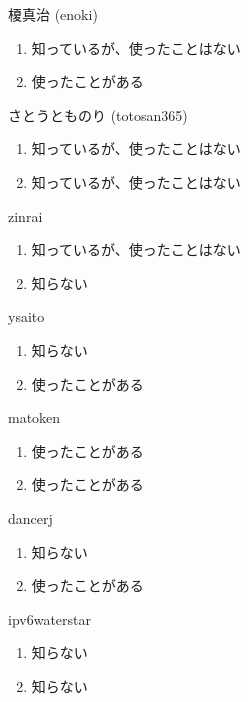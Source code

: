 \begin{prework}{ 榎真治 (enoki) }
  \begin{enumerate}
  \item 知っているが、使ったことはない
  \item 使ったことがある
  \end{enumerate}
\end{prework}

\begin{prework}{ さとうとものり (totosan365) }
  \begin{enumerate}
  \item 知っているが、使ったことはない
  \item 知っているが、使ったことはない
  \end{enumerate}
\end{prework}

\begin{prework}{ zinrai }
  \begin{enumerate}
  \item 知っているが、使ったことはない
  \item 知らない
  \end{enumerate}
\end{prework}

\begin{prework}{ ysaito }
  \begin{enumerate}
  \item 知らない
  \item 使ったことがある
  \end{enumerate}
\end{prework}

\begin{prework}{ matoken }
  \begin{enumerate}
  \item 使ったことがある
  \item 使ったことがある
  \end{enumerate}
\end{prework}

\begin{prework}{ dancerj }
  \begin{enumerate}
  \item 知らない
  \item 使ったことがある
  \end{enumerate}
\end{prework}

\begin{prework}{ ipv6waterstar }
  \begin{enumerate}
  \item 知らない
  \item 知らない
  \end{enumerate}
\end{prework}

